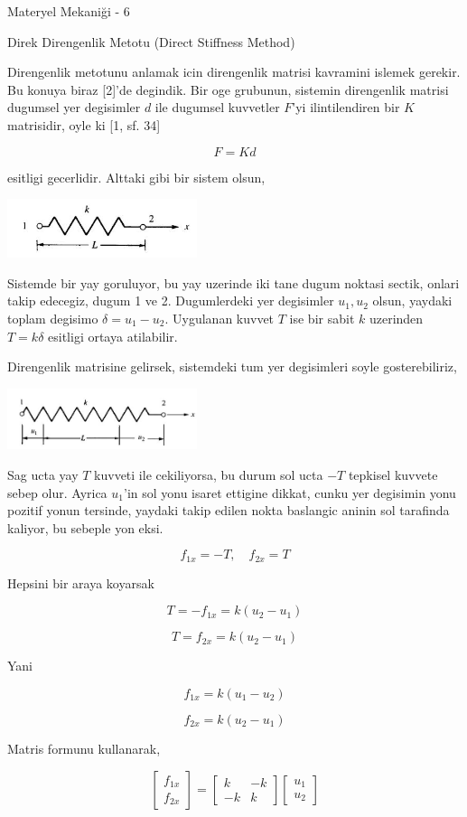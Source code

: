 \documentclass[12pt,fleqn]{article}\usepackage{../../common}
\begin{document}
Materyel Mekaniği - 6

Direk Direngenlik Metotu (Direct Stiffness Method)

Direngenlik metotunu anlamak icin direngenlik matrisi kavramini islemek
gerekir. Bu konuya biraz [2]'de degindik. Bir oge grubunun, sistemin direngenlik
matrisi dugumsel yer degisimler $d$ ile dugumsel kuvvetler $F$'yi ilintilendiren
bir $K$ matrisidir, oyle ki [1, sf. 34]

$$
F = K d
$$

esitligi gecerlidir. Alttaki gibi bir sistem olsun,

\includegraphics[width=15em]{phy_020_strs_06_03.jpg}

Sistemde bir yay goruluyor, bu yay uzerinde iki tane dugum noktasi sectik,
onlari takip edecegiz, dugum 1 ve 2. Dugumlerdeki yer degisimler $u_1,u_2$
olsun, yaydaki toplam degisimo $\delta = u_1 - u_2$. Uygulanan kuvvet $T$
ise bir sabit $k$ uzerinden $T = k \delta$ esitligi ortaya atilabilir.

Direngenlik matrisine gelirsek, sistemdeki tum yer degisimleri soyle gosterebiliriz,

\includegraphics[width=15em]{phy_020_strs_06_04.jpg}

Sag ucta yay $T$ kuvveti ile cekiliyorsa, bu durum sol ucta $-T$ tepkisel
kuvvete sebep olur. Ayrica $u_1$'in sol yonu isaret ettigine dikkat, cunku yer
degisimin yonu pozitif yonun tersinde, yaydaki takip edilen nokta baslangic
aninin sol tarafinda kaliyor, bu sebeple yon eksi.

$$
f_{1x} = -T, \quad f_{2x} = T
$$

Hepsini bir araya koyarsak

$$
T = -f_{1x} = k (u_2 - u_1)
$$

$$
T = f_{2x} = k (u_2 - u_1)
$$

Yani

$$
f_{1x} = k(u_1 - u_2)
$$

$$
f_{2x} = k(u_2 - u_1)
$$

Matris formunu kullanarak,

$$
\left[\begin{array}{ccc}
f_{1x} \\ f_{2x}
\end{array}\right] = 
\left[\begin{array}{ccc}
k & -k \\ -k & k
\end{array}\right]
\left[\begin{array}{ccc}
u_1 \\ u_2
\end{array}\right]
$$
\end{document}
